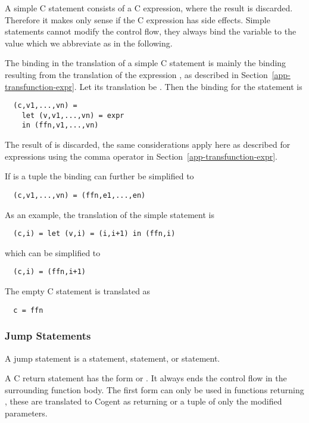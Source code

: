 A simple C statement consists of a C expression, where the result is discarded. Therefore it makes only sense
if the C expression has side effects. Simple statements cannot modify the control flow, they always bind the 
variable  to the value  which we abbreviate as  in the following.

The binding in the translation of a simple C statement  is mainly the binding resulting from the translation 
of the expression , as described in Section~\ref{app-transfunction-expr}. Let its translation
be .
Then the binding for the statement  is
\begin{verbatim}
  (c,v1,...,vn) = 
    let (v,v1,...,vn) = expr
    in (ffn,v1,...,vn)
\end{verbatim}

The result  of  is discarded, the same considerations apply here as described for expressions using
the comma operator in Section~\ref{app-transfunction-expr}. 

If  is a tuple 
 the binding can further be simplified to
\begin{verbatim}
  (c,v1,...,vn) = (ffn,e1,...,en)
\end{verbatim}

As an example, the translation of the simple statement  is
\begin{verbatim}
  (c,i) = let (v,i) = (i,i+1) in (ffn,i)
\end{verbatim}
which can be simplified to
\begin{verbatim}
  (c,i) = (ffn,i+1)
\end{verbatim}

The empty C statement \code{;} is translated as
\begin{verbatim}
  c = ffn
\end{verbatim}

\subsubsection{Jump Statements}

A jump statement is a  statement,  statement, or  statement.

A C return statement has the form  or . It always ends the control flow in the surrounding
function body. The first form can only be used in functions returning , these are translated to Cogent as returning 
\code{()} or a tuple of only the modified parameters. 

